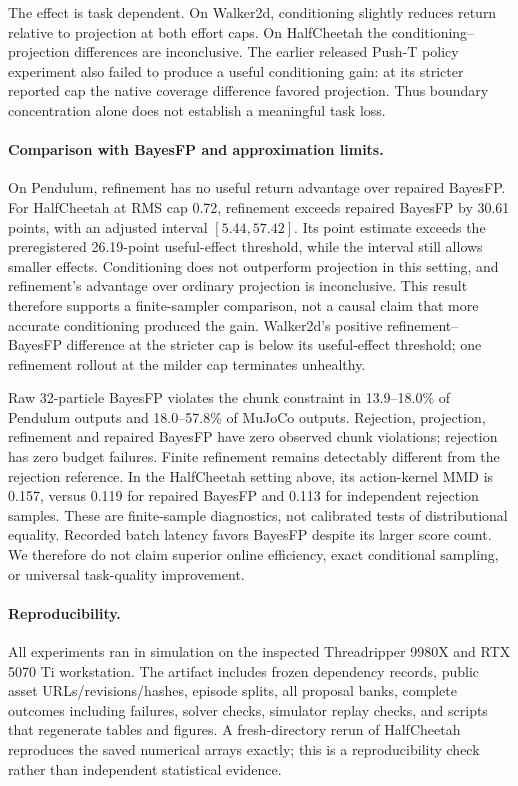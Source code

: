 The effect is task dependent. On Walker2d, conditioning slightly reduces
return relative to projection at both effort caps. On HalfCheetah the
conditioning--projection differences are inconclusive. The earlier released
Push-T policy experiment also failed to produce a useful conditioning gain:
at its stricter reported cap the native coverage difference favored projection.
Thus boundary concentration alone does not establish a meaningful task loss.

\paragraph{Comparison with BayesFP and approximation limits.}
On Pendulum, refinement has no useful return advantage over repaired BayesFP.
For HalfCheetah at RMS cap 0.72, refinement exceeds repaired BayesFP by 30.61
points, with an adjusted interval $[5.44,57.42]$. Its point estimate exceeds
the preregistered 26.19-point useful-effect threshold, while the interval still
allows smaller effects. Conditioning does not outperform projection in this
setting, and refinement's advantage over ordinary projection is inconclusive.
This result therefore supports a finite-sampler comparison, not a causal claim
that more accurate conditioning produced the gain. Walker2d's positive
refinement--BayesFP difference at the stricter cap is below its useful-effect
threshold; one refinement rollout at the milder cap terminates unhealthy.

Raw 32-particle BayesFP violates the chunk constraint in 13.9--18.0\% of
Pendulum outputs and 18.0--57.8\% of MuJoCo outputs. Rejection, projection,
refinement and repaired BayesFP have zero observed chunk violations; rejection
has zero budget failures. Finite refinement remains detectably different from
the rejection reference. In the HalfCheetah setting above, its action-kernel
MMD is 0.157, versus 0.119 for repaired BayesFP and 0.113 for independent
rejection samples. These are finite-sample diagnostics, not calibrated tests
of distributional equality. Recorded batch latency favors BayesFP despite its
larger score count. We therefore do not claim superior online efficiency,
exact conditional sampling, or universal task-quality improvement.

\paragraph{Reproducibility.}
All experiments ran in simulation on the inspected Threadripper 9980X and
RTX 5070 Ti workstation. The artifact includes frozen dependency records,
public asset URLs/revisions/hashes, episode splits, all proposal banks,
complete outcomes including failures, solver checks, simulator replay checks,
and scripts that regenerate tables and figures. A fresh-directory rerun of
HalfCheetah reproduces the saved numerical arrays exactly; this is a
reproducibility check rather than independent statistical evidence.
